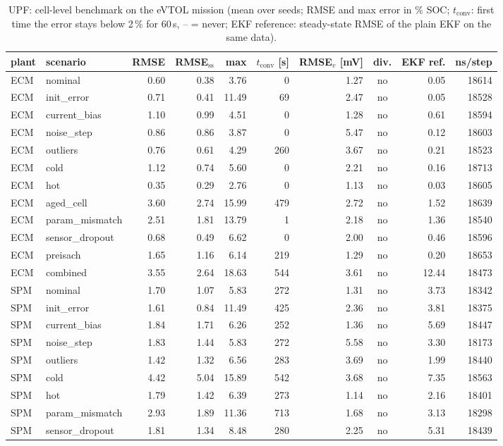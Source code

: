\begin{table}[H]\centering\footnotesize\setlength{\tabcolsep}{4pt}
\caption{UPF: cell-level benchmark on the eVTOL mission (mean over seeds; RMSE and max error in \% SOC; $t_\mathrm{conv}$: first time the error stays below 2\,\% for 60\,s, -- = never; EKF reference: steady-state RMSE of the plain EKF on the same data).}\label{tab:cell_UPF}
\begin{tabular}{llrrrrrcrr}\toprule
plant & scenario & RMSE & RMSE$_\mathrm{ss}$ & max & $t_\mathrm{conv}$ [s] & RMSE$_v$ [mV] & div. & EKF ref. & ns/step \\ \midrule
ECM & nominal & 0.60 & 0.38 & 3.76 & 0 & 1.27 & no & 0.05 & 18614 \\
ECM & init\_error & 0.71 & 0.41 & 11.49 & 69 & 2.47 & no & 0.05 & 18528 \\
ECM & current\_bias & 1.10 & 0.99 & 4.51 & 0 & 1.28 & no & 0.61 & 18594 \\
ECM & noise\_step & 0.86 & 0.86 & 3.87 & 0 & 5.47 & no & 0.12 & 18603 \\
ECM & outliers & 0.76 & 0.61 & 4.29 & 260 & 3.67 & no & 0.21 & 18523 \\
ECM & cold & 1.12 & 0.74 & 5.60 & 0 & 2.21 & no & 0.16 & 18713 \\
ECM & hot & 0.35 & 0.29 & 2.76 & 0 & 1.13 & no & 0.03 & 18605 \\
ECM & aged\_cell & 3.60 & 2.74 & 15.99 & 479 & 2.72 & no & 1.52 & 18639 \\
ECM & param\_mismatch & 2.51 & 1.81 & 13.79 & 1 & 2.18 & no & 1.36 & 18540 \\
ECM & sensor\_dropout & 0.68 & 0.49 & 6.62 & 0 & 2.00 & no & 0.46 & 18596 \\
ECM & preisach & 1.65 & 1.16 & 6.14 & 219 & 1.29 & no & 0.20 & 18653 \\
ECM & combined & 3.55 & 2.64 & 18.63 & 544 & 3.61 & no & 12.44 & 18473 \\
\midrule
SPM & nominal & 1.70 & 1.07 & 5.83 & 272 & 1.31 & no & 3.73 & 18342 \\
SPM & init\_error & 1.61 & 0.84 & 11.49 & 425 & 2.36 & no & 3.81 & 18375 \\
SPM & current\_bias & 1.84 & 1.71 & 6.26 & 252 & 1.36 & no & 5.69 & 18447 \\
SPM & noise\_step & 1.83 & 1.44 & 5.83 & 272 & 5.58 & no & 3.30 & 18173 \\
SPM & outliers & 1.42 & 1.32 & 6.56 & 283 & 3.69 & no & 1.99 & 18440 \\
SPM & cold & 4.42 & 5.04 & 15.89 & 542 & 3.68 & no & 7.35 & 18563 \\
SPM & hot & 1.79 & 1.42 & 6.39 & 273 & 1.14 & no & 2.16 & 18401 \\
SPM & param\_mismatch & 2.93 & 1.89 & 11.36 & 713 & 1.68 & no & 3.13 & 18298 \\
SPM & sensor\_dropout & 1.81 & 1.34 & 8.48 & 280 & 2.25 & no & 5.31 & 18439 \\
\bottomrule\end{tabular}\end{table}
